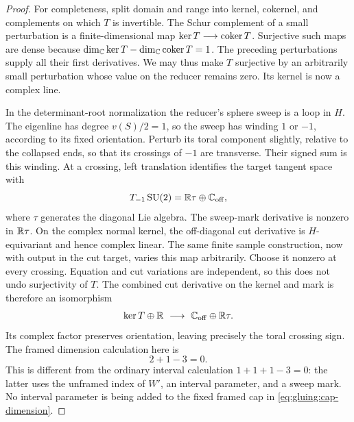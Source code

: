 \begin{proof}
For completeness, split domain and range into kernel, cokernel, and
complements on which $T$ is invertible.  The Schur complement of a
small perturbation is a finite-dimensional map
$\ker T\longrightarrow\operatorname{coker} T$.  Surjective such maps are dense
because $\dim_{\mathbb C}\ker T-\dim_{\mathbb C}\operatorname{coker} T=1$.
The preceding perturbations supply all their first derivatives.
We may thus make $T$ surjective by an arbitrarily small perturbation
whose value on the reducer remains zero.  Its kernel is now a complex
line.

In the determinant-root normalization the reducer's sphere sweep is
a loop in $H$.  The eigenline has degree $v(S)/2=1$, so the sweep has
winding $1$ or $-1$, according to its fixed orientation.  Perturb its
toral component slightly, relative to the collapsed ends, so that its
crossings of $-1$ are transverse.  Their signed sum is this winding.
At a crossing, left translation identifies the target tangent space
with
\[
 T_{-1}\operatorname{SU}(2)=\mathbb R\tau\oplus\mathbb C_{\mathrm{off}},
\]
where $\tau$ generates the diagonal Lie algebra.  The sweep-mark
derivative is nonzero in $\mathbb R\tau$.  On the complex normal kernel, the
off-diagonal cut derivative is $H$-equivariant and hence complex linear.
The same finite sample construction, now with output in the cut
target, varies this map arbitrarily.  Choose it nonzero at every
crossing.  Equation and cut variations are independent, so this does
not undo surjectivity of $T$.  The combined cut derivative on the
kernel and mark is therefore an isomorphism
\begin{equation}
 \ker T\oplus\R\ \longrightarrow\
 \C_{\mathrm{off}}\oplus\R\tau.
 \label{eq:gluing:cap-cut}
\end{equation}
Its complex factor preserves orientation, leaving precisely the
toral crossing sign.  The framed dimension calculation here is
\begin{equation}
 2+1-3=0.
 \label{eq:gluing:cap-dimension}
\end{equation}
This is different from the ordinary interval calculation
$1+1+1-3=0$: the latter uses the unframed index of $W'$, an interval
parameter, and a sweep mark.  No interval parameter is being added
to the fixed framed cap in \eqref{eq:gluing:cap-dimension}.


\end{proof}
